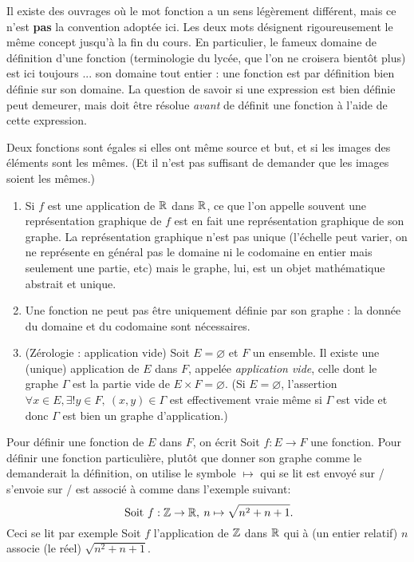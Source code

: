 \begin{attention}
Il existe des ouvrages où le mot \og fonction\fg{} a un sens légèrement différent, mais ce n'est \textbf{pas} la convention adoptée ici. Les deux mots désignent rigoureusement le même concept jusqu'à la fin du cours. En particulier, le fameux \og domaine de définition d'une fonction\fg{} (terminologie du lycée, que l'on ne croisera bientôt plus) est ici toujours ...  son domaine tout entier : une fonction est par définition bien définie sur son domaine. La question de savoir si une expression est bien définie peut demeurer, mais doit être résolue \emph{avant} de définit une fonction à l'aide de cette expression.
\end{attention}

Deux fonctions sont égales si elles ont même source et but, et si les images des éléments sont les mêmes. (Et il n'est pas suffisant de demander que les images soient les mêmes.)



\begin{remarque}
\begin{enumerate}
\item Si $f$ est une application de $\mathbb{R}$ dans $\mathbb{R}$, ce que l'on appelle souvent une \og représentation graphique de $f$\fg{} est en fait une représentation graphique de son graphe. La représentation graphique n'est pas unique (l'échelle peut varier, on ne représente en général pas le domaine ni le codomaine en entier mais seulement une partie, etc) mais le graphe, lui, est un objet mathématique abstrait et unique.
\item Une fonction ne peut pas être uniquement définie par son graphe : la donnée du domaine et du codomaine sont nécessaires.
\item {} (Zérologie : application vide) Soit $E = \varnothing$ et $F$ un ensemble. Il existe une (unique) application de $E$ dans $F$, appelée \emph{application vide}, celle dont le graphe $\Gamma$ est la partie vide de $E\times F = \varnothing$. (Si $E=\varnothing$,  l'assertion \og $\forall x\in E, \exists! y\in F,\: (x,y)\in \Gamma$\fg{} est effectivement vraie même si $\Gamma$ est vide et donc $\Gamma$ est bien un graphe d'application.)
\end{enumerate}
\end{remarque}

Pour définir une fonction de $E$ dans $F$, on écrit \og Soit $f : E\to F$ une fonction\fg. Pour définir une fonction particulière, plutôt que donner son graphe comme le demanderait la définition, on utilise le symbole \og$\mapsto$\fg{} qui se lit \og est envoyé sur / s'envoie sur / est associé à \fg{} comme dans l'exemple suivant:
\[
\text{ Soit } f :\mathbb{Z} \to \mathbb{R},\: n\mapsto \sqrt{n^2+n+1}.
\]
Ceci se lit par exemple \og Soit $f$ l'application de $\mathbb{Z}$ dans $\mathbb{R}$ qui à (un entier relatif) $n$ associe (le réel) $\sqrt{n^2+n+1}$\fg.


